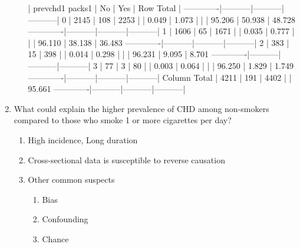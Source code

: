 \documentclass{article}
\begin{document}
\begin{enumerate}
\begin{enumerate}
\begin{Schunk}
\begin{Soutput}
             | prevchd1 
      packs1 |       No  |      Yes  | Row Total | 
-------------|-----------|-----------|-----------|
           0 |     2145  |      108  |     2253  | 
             |    0.049  |    1.073  |           | 
             |   95.206% |    4.794% |   51.181% | 
             |   50.938% |   56.545% |           | 
             |   48.728% |    2.453% |           | 
-------------|-----------|-----------|-----------|
           1 |     1606  |       65  |     1671  | 
             |    0.035  |    0.777  |           | 
             |   96.110% |    3.890% |   37.960% | 
             |   38.138% |   34.031% |           | 
             |   36.483% |    1.477% |           | 
-------------|-----------|-----------|-----------|
           2 |      383  |       15  |      398  | 
             |    0.014  |    0.298  |           | 
             |   96.231% |    3.769% |    9.041% | 
             |    9.095% |    7.853% |           | 
             |    8.701% |    0.341% |           | 
-------------|-----------|-----------|-----------|
           3 |       77  |        3  |       80  | 
             |    0.003  |    0.064  |           | 
             |   96.250% |    3.750% |    1.817% | 
             |    1.829% |    1.571% |           | 
             |    1.749% |    0.068% |           | 
-------------|-----------|-----------|-----------|
Column Total |     4211  |      191  |     4402  | 
             |   95.661% |    4.339% |           | 
-------------|-----------|-----------|-----------|
\end{Soutput}
\end{Schunk}

\end{enumerate}
\pagebreak
\item What could explain the higher prevalence of CHD among non-smokers compared to 
those who smoke 1 or more cigarettes per day?
\begin{enumerate}
  \item High incidence, Long duration
  \item Cross-sectional data is susceptible to reverse causation
  \item Other common suspects
  \begin{enumerate}
  \item Bias
  \item Confounding 
  \item Chance
\end{enumerate}

\end{enumerate}


\end{enumerate}
\end{document}
